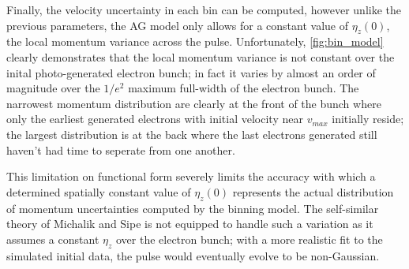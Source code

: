 
Finally, the velocity uncertainty in each bin can be computed, however unlike the previous parameters, the AG model only allows for a constant value of $\eta_z(0)$, the local momentum variance across the pulse.
Unfortunately, \ref{fig:bin_model} clearly demonstrates that the local momentum variance is not constant over the inital photo-generated electron bunch; in fact it varies by almost an order of magnitude over the $ 1/e^{2} $ maximum full-width of the electron bunch. 
The narrowest momentum distribution are clearly at the front of the bunch where only the earliest generated electrons with initial velocity near $ v_{max} $ initially reside; the largest distribution is at the back where the last electrons generated still haven't had time to seperate from one another.

This limitation on functional form severely limits the accuracy with which a determined spatially constant value of $\eta_z(0)$ represents the actual distribution of momentum uncertainties computed by the binning model.
The self-similar theory of Michalik and Sipe \cite{michalik_analytic_2006} is not equipped to handle such a variation as it assumes a constant $ \eta_{ z } $ over the electron bunch; with a more realistic fit to the simulated initial data, the pulse would eventually evolve to be non-Gaussian.

